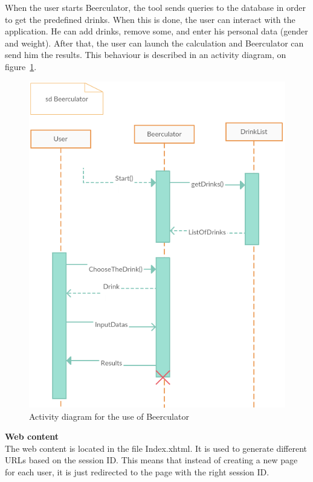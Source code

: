 When the user starts Beerculator, the tool sends queries to the database in order to get the predefined drinks. When this is done, the user can interact with the application. He can add drinks, remove some, and enter his personal data (gender and weight). After that, the user can launch the calculation and Beerculator can send him the results. This behaviour is described in an activity diagram, on {\sc figure}~\ref{fig:activ}.

\begin{figure}[H]
\centering
   \includegraphics[scale=0.9]{./figures/activDiag.png}
   \caption{Activity diagram for the use of Beerculator}
   \label{fig:activ}
\end{figure}

{\bf Web content}\\
The web content is located in the file Index.xhtml. It is used to generate different URLs based on the session ID. This means that instead of creating a new page for each user, it is just redirected to the page with the right session ID.\\

